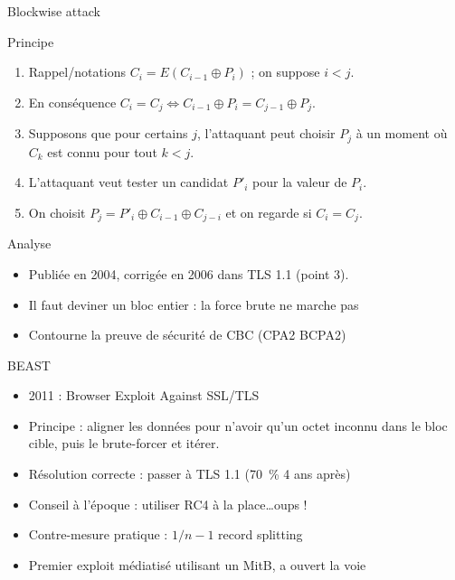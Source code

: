 \documentclass{mpg-ep-slides}
\begin{document}
\begin{frame}{Blockwise attack}
  \begin{block}{Principe}
    \begin{enumerate}
      \item Rappel/notations $C_i = E( C_{i-1} \oplus P_i )$ ; on suppose $i <
        j$.
      \item En conséquence $C_i = C_j \Longleftrightarrow C_{i-1} \oplus P_i =
        C_{j-1} \oplus P_j$.
      \item Supposons que pour certains $j$, l'attaquant peut choisir $P_j$
        à un moment où $C_k$ est connu pour tout $k < j$.
      \item L'attaquant veut tester un candidat $P'_i$ pour la valeur de $P_i$.
      \item On choisit $P_j = P'_i \oplus C_{i-1} \oplus C_{j-i}$ et
        on regarde si $C_i = C_j$.
    \end{enumerate}
  \end{block}

  \begin{block}{Analyse}
    \begin{itemize}
      \item Publiée en 2004, corrigée en 2006 dans TLS 1.1 (point 3).
      \item Il faut deviner un bloc entier : la force brute ne marche pas
      \item Contourne la preuve de sécurité de CBC (CPA2 \textrightarrow{}
        BCPA2)
    \end{itemize}
  \end{block}
\end{frame}

\begin{frame}{BEAST}
  \begin{itemize}
    \item 2011 : Browser Exploit Against SSL/TLS
    \item Principe : aligner les données pour n'avoir qu'un octet inconnu dans
      le bloc cible, puis le brute-forcer et itérer.
    \item Résolution correcte : passer à TLS 1.1 (70~\% 4 ans après)
    \item Conseil à l'époque : utiliser RC4 à la place\dots oups !
    \item Contre-mesure pratique : $1/n-1$ record splitting
    \item Premier exploit médiatisé utilisant un MitB, a ouvert la voie
  \end{itemize}
\end{frame}
\end{document}
